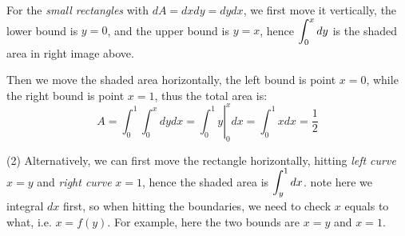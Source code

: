 \documentclass[11pt, a4paper]{MATH2023}
\begin{document}
\begin{spacing}{1.3}
    For the {\it small rectangles} with $dA=dxdy=dydx$, we first move it vertically,
    the lower bound is $y=0$, and the upper bound is $y=x$, hence $\disp \int_0^x dy$
    is the shaded area in right image above.

    Then we move the shaded area horizontally, the left bound is point $x=0$, while 
    the right bound is point $x=1$, thus the total area is: 
    $$A=\int_0^1 \int_0^x dydx=\left. \int_0^1 y \right\vert_0^x dx=\int_0^1 xdx=\frac{1}{2}$$

    (2) Alternatively, we can first move the rectangle horizontally, hitting 
    {\it left curve} $x=y$ and {\it right curve} $x=1$, hence the shaded area is 
    $\disp \int_y^1 dx$. {\red note here we integral $dx$ first, so when hitting 
    the boundaries, we need to check $x$ equals to what, i.e. $x=f(y)$.}
    For example, here the two bounds are $x=y$ and $x=1$.
    \begin{center}
        \begin{tikzpicture}[x=0.75pt,y=0.75pt,yscale=-1,xscale=1]


\end{tikzpicture}
\end{center}
\end{spacing}
\end{document}
